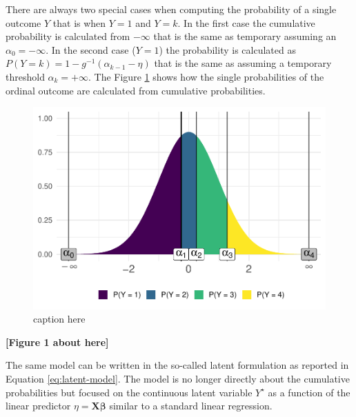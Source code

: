 \documentclass[
  man,floatsintext]{apa6}
\begin{document}
There are always two special cases when computing the probability of a single outcome \(Y\) that is when \(Y = 1\) and \(Y = k\). In the first case the cumulative probability is calculated from \(-\infty\) that is the same as temporary assuming an \(\alpha_0 = -\infty\). In the second case (\(Y = 1\)) the probability is calculated as \(P(Y = k) = 1 - g^{-1}(\alpha_{k - 1} - \eta)\) that is the same as assuming a temporary threshold \(\alpha_k = +\infty\). The Figure \ref{fig:fig-explain-cumulative} shows how the single probabilities of the ordinal outcome are calculated from cumulative probabilities.

\scriptsize

\begin{figure}

{\centering \includegraphics{paper_files/figure-latex/fig-explain-cumulative-1} 

}

\caption{caption here}\label{fig:fig-explain-cumulative}
\end{figure}

\begin{center}\textbf{[Figure 1 about here]} \end{center}

\normalsize

The same model can be written in the so-called latent formulation as reported in Equation \eqref{eq:latent-model}. The model is no longer directly about the cumulative probabilities but focused on the continuous latent variable \(Y^\star\) as a function of the linear predictor \(\eta = \mathbf{X} \boldsymbol{\beta}\) similar to a standard linear regression.
\end{document}
